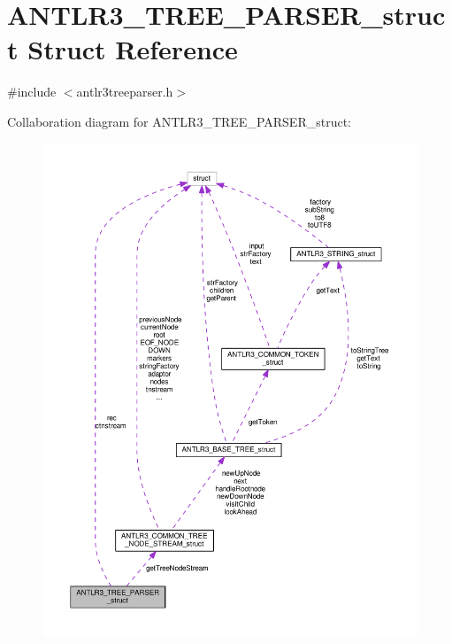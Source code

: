 \hypertarget{struct_a_n_t_l_r3___t_r_e_e___p_a_r_s_e_r__struct}{\section{A\-N\-T\-L\-R3\-\_\-\-T\-R\-E\-E\-\_\-\-P\-A\-R\-S\-E\-R\-\_\-struct Struct Reference}
\label{struct_a_n_t_l_r3___t_r_e_e___p_a_r_s_e_r__struct}
}


{\ttfamily \#include $<$antlr3treeparser.\-h$>$}



Collaboration diagram for A\-N\-T\-L\-R3\-\_\-\-T\-R\-E\-E\-\_\-\-P\-A\-R\-S\-E\-R\-\_\-struct\-:
\nopagebreak
\begin{figure}[H]
\begin{center}
\leavevmode
\includegraphics[width=350pt]{struct_a_n_t_l_r3___t_r_e_e___p_a_r_s_e_r__struct__coll__graph}
\end{center}
\end{figure}

